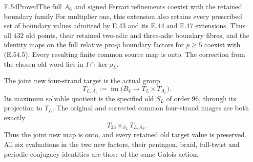 \begin{statement}{E.54}{Proved}{The full $A_6$ and signed Ferrari refinements coexist with the retained boundary family}
For multiplier one, this extension also retains every
prescribed set of boundary values admitted by E.43 and
its E.44 and E.47 extensions.  Thus all $432$ old points,
their retained two-adic and three-adic boundary fibres,
and the identity maps on the full relative pro-$p$ boundary
factors for $p\ge5$ coexist with \textup{(E.54.5)}.
Every resulting finite common source map is onto.
The correction from the chosen old word lies in
$I\cap\ker\rho_L$.

The joint new four-strand target is the actual group
\[
 T_{L,A_6}:=\operatorname{im}
       \bigl(B_4\longrightarrow T_L\times T_{A_6}\bigr).
 \tag{E.54.6}
\]
Its maximum solvable quotient is the specified old
$S_L$ of order $96$, through its projection to $T_L$.
The original and corrected common four-strand images
are both exactly
\[
                  T_{23}\times_{S_L}T_{L,A_6}.
 \tag{E.54.6a}
\]
Thus the joint new map is onto, and every retained old
target value is preserved.  All six evaluations in the
two new factors, their pentagon, braid, full-twist and
periodic-conjugacy identities are those of the same
Galois action.
\end{statement}

